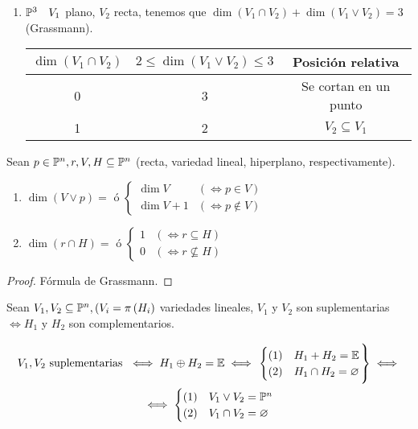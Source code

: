 \begin{example}
\begin{enumerate}
\begin{center}
\begin{tabular}{|c|c|c|}
        \end{tabular} \end{center}
        \item $\mathbb{P}^3 \quad V_1$ plano, $V_2$ recta, tenemos que $\dim \left( V_1 \cap V_2 \right) + \dim \left( V_1 \vee V_2 \right) = 3$ (Grassmann).
        \begin{center} \begin{tabular}{|c|c|c|}
            \hline $\dim \left( V_1 \cap V_2 \right)$ & $2 \leq \dim \left( V_1 \vee V_2 \right) \leq 3$  & Posición relativa \\
            \hline \hline
            0 & 3 & Se cortan en un punto \\ \hline
            1 & 2 & $V_2 \subseteq V_1$ \\ \hline
        \end{tabular} \end{center}
    \end{enumerate}
\end{example}
\begin{prop}
    Sean $p \in \mathbb{P}^n, r, V, H \subseteq \mathbb{P}^n$ (recta, variedad lineal, hiperplano, respectivamente).
    \begin{enumerate}
        \item $\dim \left( V \vee p \right) = \text{ ó } \begin{cases} \dim V & (\iff p \in V) \\ \dim V + 1 & (\iff p \notin V) \end{cases}$
        \item $\dim \left( r \cap H \right) = \text{ ó } \begin{cases} 1 & (\iff r \subseteq H) \\ 0 & (\iff r \nsubseteq H) \end{cases}$
    \end{enumerate}
\end{prop}
\begin{proof}
    Fórmula de Grassmann.
\end{proof}
\begin{defi}
    Sean $V_1, V_2 \subseteq \mathbb{P}^n, (V_i = \pi \left( H_i \right)$ variedades lineales, $V_1$ y $V_2$ son suplementarias $\iff H_1$ y $H_2$
    son complementarios.
\end{defi}
\begin{obs}
    \begin{gather*}
        V_1, V_2\text{ suplementarias }\iff H_1 \oplus H_2 = \mathbb{E} \iff \left. \begin{cases} (1) & H_1 + H_2 = \mathbb{E} \\ (2) & H_1 \cap H_2 = \varnothing \end{cases} \right\} \iff \\
        \iff \begin{cases} (1) & V_1 \vee V_2 = \mathbb{P}^n \\ (2) & V_1 \cap V_2 = \varnothing \end{cases} \\
    \end{gather*}
\end{obs}
